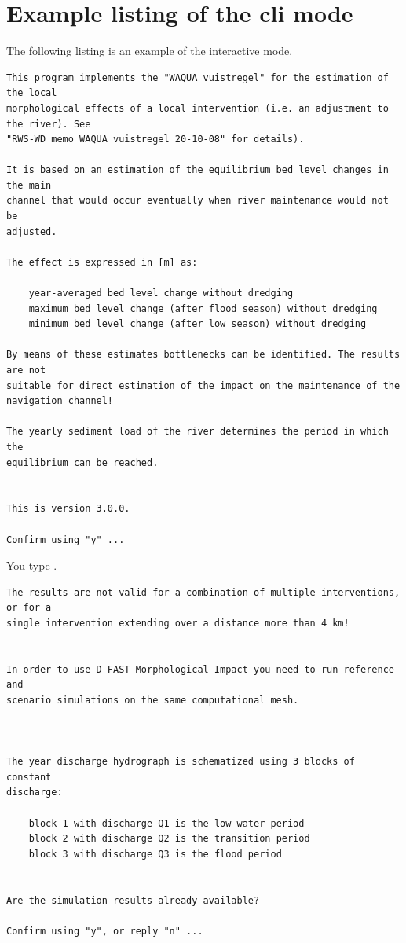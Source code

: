 \pagebreak[4]
\section{Example listing of the cli mode} \label{Sec:cli_dialog}

The following listing is an example of the interactive  mode.

\begin{Verbatim}
This program implements the "WAQUA vuistregel" for the estimation of the local
morphological effects of a local intervention (i.e. an adjustment to the river). See
"RWS-WD memo WAQUA vuistregel 20-10-08" for details).

It is based on an estimation of the equilibrium bed level changes in the main
channel that would occur eventually when river maintenance would not be
adjusted.

The effect is expressed in [m] as:

    year-averaged bed level change without dredging
    maximum bed level change (after flood season) without dredging
    minimum bed level change (after low season) without dredging

By means of these estimates bottlenecks can be identified. The results are not
suitable for direct estimation of the impact on the maintenance of the
navigation channel!

The yearly sediment load of the river determines the period in which the
equilibrium can be reached.


This is version 3.0.0.

Confirm using "y" ...
\end{Verbatim}

You type .

\begin{Verbatim}
The results are not valid for a combination of multiple interventions, or for a
single intervention extending over a distance more than 4 km!


In order to use D-FAST Morphological Impact you need to run reference and
scenario simulations on the same computational mesh.



The year discharge hydrograph is schematized using 3 blocks of constant
discharge:

    block 1 with discharge Q1 is the low water period
    block 2 with discharge Q2 is the transition period
    block 3 with discharge Q3 is the flood period


Are the simulation results already available?

Confirm using "y", or reply "n" ...
\end{Verbatim}

